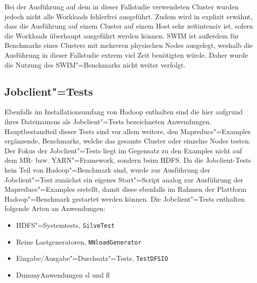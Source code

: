 Bei der Ausführung auf dem in dieser Fallstudie verwendeten Cluster wurden jedoch nicht alle Workloads fehlerfrei ausgeführt.
Zudem wird in \cite{InriaTutorial} explizit erwähnt, dass die Ausführung auf einem Cluster auf einem Host sehr zeitintensiv ist, sofern die Workloads überhaupt ausgeführt werden können.
\gls{SWIM} ist außerdem für Benchmarks eines Clusters mit mehreren physischen Nodes ausgelegt, weshalb die Ausführung in dieser Fallstudie extrem viel Zeit benötigten würde.
Daher wurde die Nutzung des \gls{SWIM}"=Benchmarks nicht weiter verfolgt.

\subsection{Jobclient"=Tests}
\label{subsec:jobclient}

Ebenfalls im Installationsumfang von Hadoop enthalten sind die hier aufgrund ihres Dateinamens als Jobclient"=Tests bezeichneten Anwendungen.
Hauptbestandteil dieser Tests sind vor allem weitere, den Mapreduce"=Examples ergänzende, Benchmarks, welche das gesamte Cluster oder einzelne Nodes testen.
Der Fokus der Jobclient"=Tests liegt im Gegensatz zu den Examples nicht auf dem \gls{MR}- bzw. YARN"=Framework, sondern beim HDFS.
Da die Jobclient-Tests kein Teil von Hadoop"=Benchmark sind, wurde zur Ausführung der Jobclient"=Test zunächst ein eigenes Start"=Script analog zur Ausführung der Mapreduce"=Examples erstellt, damit diese ebenfalls im Rahmen der Plattform Hadoop"=Benchmark gestartet werden können.
Die Jobclient"=Tests enthalten \uA folgende Arten an Anwendungen:

\begin{itemize}
    \item HDFS"=Systemtests, \zB \texttt{SilveTest}
    \item Reine Lastgeneratoren, \zB \texttt{NNloadGenerator}
    \item Eingabe/Ausgabe"=Durchsatz"=Tests, \zB \texttt{TestDFSIO}
    \item DummyAnwendungen \acrlong{sl} und \acrlong{fl}
\end{itemize}
